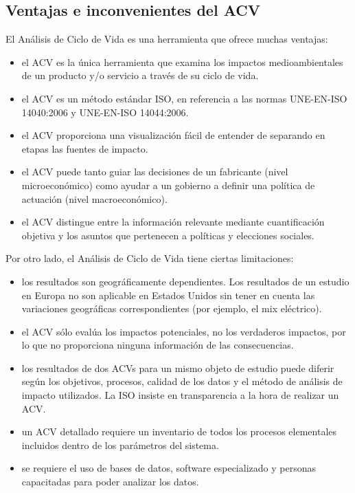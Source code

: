 \subsection{Ventajas e inconvenientes del ACV}

El Análisis de Ciclo de Vida es una herramienta que ofrece muchas ventajas:
\begin{itemize}
  \item el ACV es la única herramienta que examina los impactos medioambientales de un producto y/o servicio a través de su ciclo de vida.
  \item el ACV es un método estándar ISO, en referencia a las normas UNE-EN-ISO 14040:2006 y UNE-EN-ISO 14044:2006.
  \item el ACV proporciona una visualización fácil de entender de separando en etapas las fuentes de impacto.
  \item el ACV puede tanto guiar las decisiones de un fabricante (nivel microeconómico) como ayudar a un gobierno a definir una política de actuación (nivel macroeconómico).
  \item el ACV distingue entre la información relevante mediante cuantificación objetiva y los asuntos que pertenecen a políticas y elecciones sociales.
\end{itemize}

Por otro lado, el Análisis de Ciclo de Vida tiene ciertas limitaciones:
\begin{itemize}
  \item los resultados son geográficamente dependientes. Los resultados de un estudio en Europa no son aplicable en Estados Unidos sin tener en cuenta las variaciones geográficas correspondientes (por ejemplo, el mix eléctrico).
  \item el ACV sólo evalúa los impactos potenciales, no los verdaderos impactos, por lo que no proporciona ninguna información de las consecuencias.
  \item los resultados de dos ACVs para un mismo objeto de estudio puede diferir según los objetivos, procesos, calidad de los datos y el método de análisis de impacto utilizados. La ISO insiste en transparencia a la hora de realizar un ACV.
  \item un ACV detallado requiere un inventario de todos los procesos elementales incluidos dentro de los parámetros del sistema.
  \item se requiere el uso de bases de datos, software especializado y personas capacitadas para poder analizar los datos.
\end{itemize}

